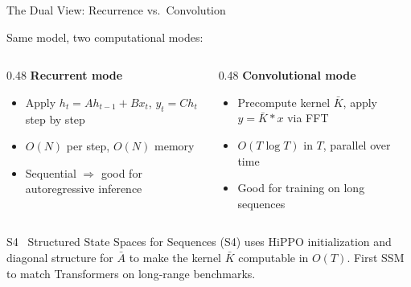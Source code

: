 \begin{frame}{The Dual View: Recurrence vs.\ Convolution}

  Same model, two computational modes:
  \begin{columns}
    \begin{column}{0.48\textwidth}
      \textbf{Recurrent mode}
      \begin{itemize}
        \item Apply $h_t = A h_{t-1} + B x_t$, $y_t = C h_t$ step by step
        \item $O(N)$ per step, $O(N)$ memory
        \item Sequential $\Rightarrow$ good for autoregressive inference
      \end{itemize}
    \end{column}
    \begin{column}{0.48\textwidth}
      \textbf{Convolutional mode}
      \begin{itemize}
        \item Precompute kernel $\bar{K}$, apply $y = \bar{K} \ast x$ via FFT
        \item $O(T \log T)$ in $T$, parallel over time
        \item Good for training on long sequences
      \end{itemize}
    \end{column}
  \end{columns}

  \vspace{0.5em}
  \begin{block}{S4~\cite{gu2022s4}}
    Structured State Spaces for Sequences (S4) uses HiPPO initialization and diagonal structure for $\bar{A}$ to make the kernel $\bar{K}$ computable in $O(T)$. First SSM to match Transformers on long-range benchmarks.
  \end{block}
\end{frame}

